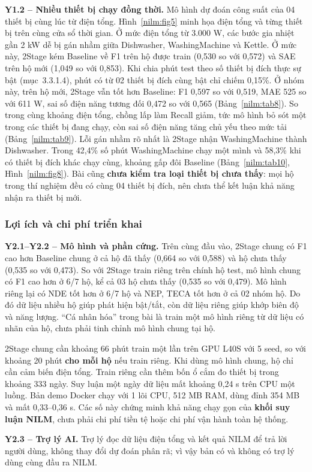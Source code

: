 \textbf{Y1.2 – Nhiều thiết bị chạy đồng thời.} Mô hình dự đoán công suất của 04 thiết bị cùng lúc từ điện tổng. Hình~\ref{nilm:fig5} minh họa điện tổng và từng thiết bị trên cùng cửa sổ thời gian. Ở mức điện tổng từ 3.000 W, các bước gia nhiệt gần 2 kW dễ bị gán nhầm giữa Dishwasher, WashingMachine và Kettle. Ở mức này, 2Stage kém Baseline về F1 trên hộ được train (0,530 so với 0,572) và SAE trên hộ mới (1,049 so với 0,853). Khi chia phút test theo số thiết bị đích thực sự bật (mục~3.3.1.4), phút có từ 02 thiết bị đích cùng bật chỉ chiếm 0,15\%. Ở nhóm này, trên hộ mới, 2Stage vẫn tốt hơn Baseline: F1 0,597 so với 0,519, MAE 525 so với 611 W, sai số điện năng tương đối 0,472 so với 0,565 (Bảng~\ref{nilm:tab8}). So trong cùng khoảng điện tổng, chồng lấp làm Recall giảm, tức mô hình bỏ sót một trong các thiết bị đang chạy, còn sai số điện năng tăng chủ yếu theo mức tải (Bảng~\ref{nilm:tab9}). Lỗi gán nhầm rõ nhất là 2Stage nhận WashingMachine thành Dishwasher. Trong 42,4\% số phút WashingMachine chạy một mình và 58,3\% khi có thiết bị đích khác chạy cùng, khoảng gấp đôi Baseline (Bảng~\ref{nilm:tab10}, Hình~\ref{nilm:fig8}). Bài cũng \textbf{chưa kiểm tra loại thiết bị chưa thấy}: mọi hộ trong thí nghiệm đều có cùng 04 thiết bị đích, nên chưa thể kết luận khả năng nhận ra thiết bị mới.

\subsubsection{Lợi ích và chi phí triển khai}

\textbf{Y2.1–Y2.2 – Mô hình và phần cứng.} Trên cùng đầu vào, 2Stage chung có F1 cao hơn Baseline chung ở cả hộ đã thấy (0,664 so với 0,588) và hộ chưa thấy (0,535 so với 0,473). So với 2Stage train riêng trên chính hộ test, mô hình chung có F1 cao hơn ở 6/7 hộ, kể cả 03 hộ chưa thấy (0,535 so với 0,479). Mô hình riêng lại có NDE tốt hơn ở 6/7 hộ và NEP, TECA tốt hơn ở cả 02 nhóm hộ. Do đó dữ liệu nhiều hộ giúp phát hiện bật/tắt, còn dữ liệu riêng giúp khớp biên độ và năng lượng. “Cá nhân hóa” trong bài là train một mô hình riêng từ dữ liệu có nhãn của hộ, chưa phải tinh chỉnh mô hình chung tại hộ.

2Stage chung cần khoảng 66 phút train một lần trên GPU L40S với 5 seed, so với khoảng 20 phút \textbf{cho mỗi hộ} nếu train riêng. Khi dùng mô hình chung, hộ chỉ cần cảm biến điện tổng. Train riêng cần thêm bốn ổ cắm đo thiết bị trong khoảng 333 ngày. Suy luận một ngày dữ liệu mất khoảng 0,24 s trên CPU một luồng. Bản demo Docker chạy với 1 lõi CPU, 512 MB RAM, dùng đỉnh 354 MB và mất 0,33–0,36 s. Các số này chứng minh khả năng chạy gọn của \textbf{khối suy luận NILM}, chưa phải chi phí tiền tệ hoặc chi phí vận hành toàn hệ thống.

\textbf{Y2.3 – Trợ lý AI.} Trợ lý đọc dữ liệu điện tổng và kết quả NILM để trả lời người dùng, không thay đổi dự đoán phân rã; vì vậy bản có và không có trợ lý dùng cùng đầu ra NILM.


